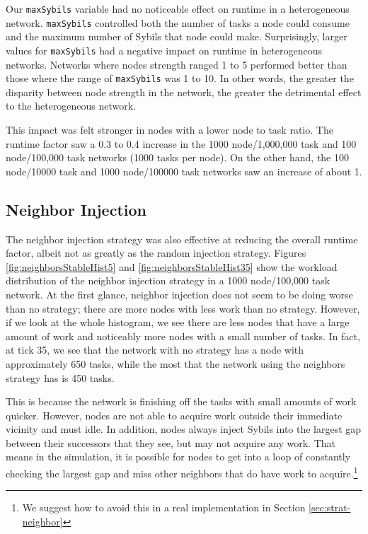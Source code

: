 \documentclass[11pt,letterpaper]{article}
\begin{document}
{	Our \texttt{maxSybils} variable had no noticeable effect on runtime in a heterogeneous network.
	\texttt{maxSybils} controlled both the number of tasks a node could consume and the maximum number of Sybils that node could make.
	Surprisingly, larger values for \texttt{maxSybils} had a negative impact on runtime in heterogeneous networks.
	Networks where nodes strength ranged 1 to 5 performed better than those where the range of \texttt{maxSybils} was 1 to 10.
	In other words, the greater the disparity between node strength in the network, the greater the detrimental effect to the heterogeneous network.
	
	This impact was felt stronger in nodes with a lower node to task ratio.
	The runtime factor saw  a 0.3 to 0.4 increase in the 1000 node/1,000,000 task and 100 node/100,000 task networks (1000 tasks per node).
	On the other hand, the 100 node/10000 task  and 1000 node/100000 task networks saw an increase of about 1.
	
	
	
	\subsection{Neighbor Injection}
	The neighbor injection strategy was also effective at reducing the overall runtime factor, albeit not as greatly as the random injection strategy.
	Figures \ref{fig:neighborsStableHist5} and \ref{fig:neighborsStableHist35} show the workload distribution of the neighbor injection strategy in a 1000 node/100,000 task network.
	At the first glance, neighbor injection does not seem to be doing worse than no strategy; there are more nodes with less work than no strategy.
	However, if we look at the whole histogram, we see there are less nodes that have a large amount of work and noticeably more nodes with a small number of tasks.
	In fact, at tick 35, we see that the network with no strategy has a node with approximately 650 tasks, while the most that the network using the neighbors strategy has is 450 tasks.
	
	This is because the network is finishing off the tasks with small amounts of work quicker.
	However, nodes are not able to acquire work outside their immediate vicinity and must idle.
	In addition, nodes always inject Sybils into the largest gap between their successors that they see, but may not acquire any work.
	That means in the simulation, it is possible for nodes to get into a loop of constantly checking the largest gap and miss other neighbors that do have work to acquire.\footnote{We suggest how to avoid this in a real implementation in Section \ref{sec:strat-neighbor}}
	
}
\end{document}
